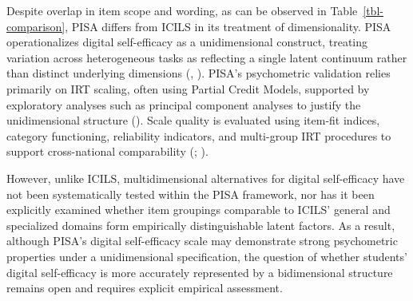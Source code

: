 \documentclass[
  letterpaper,
  DIV=11,
  numbers=noendperiod]{scrartcl}
\begin{document}
Despite overlap in item scope and wording, as can be observed in
Table~\ref{tbl-comparison}, PISA differs from ICILS in its treatment of
dimensionality. PISA operationalizes digital self-efficacy as a
unidimensional construct, treating variation across heterogeneous tasks
as reflecting a single latent continuum rather than distinct underlying
dimensions (,
). PISA's psychometric validation
relies primarily on IRT scaling, often using Partial Credit Models,
supported by exploratory analyses such as principal component analyses
to justify the unidimensional structure
(). Scale quality is evaluated
using item-fit indices, category functioning, reliability indicators,
and multi-group IRT procedures to support cross-national comparability
(;
).

However, unlike ICILS, multidimensional alternatives for digital
self-efficacy have not been systematically tested within the PISA
framework, nor has it been explicitly examined whether item groupings
comparable to ICILS' general and specialized domains form empirically
distinguishable latent factors. As a result, although PISA's digital
self-efficacy scale may demonstrate strong psychometric properties under
a unidimensional specification, the question of whether students'
digital self-efficacy is more accurately represented by a bidimensional
structure remains open and requires explicit empirical assessment.
\end{document}
